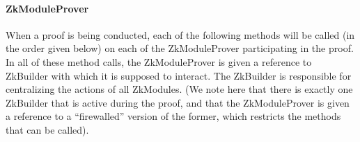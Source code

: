     \paragraph{ZkModuleProver}
    \label{sec:intf:zkmoduleprover}
    When a proof is being conducted, each of the following methods will be called (in the order
    given below) on each of the ZkModuleProver participating in the proof.
    In all of these method calls, the ZkModuleProver is given a reference to ZkBuilder with
    which it is supposed to interact. The ZkBuilder is responsible for centralizing the
    actions of all ZkModules.
    (We note here that there is exactly one ZkBuilder that is active during the proof, and that
    the ZkModuleProver is given a reference to a ``firewalled'' version of the former, which restricts the
    methods that can be called).
